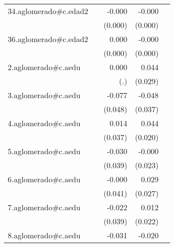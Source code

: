 {\begin{longtable}{l*{4}{D{.}{.}{-1}}}
\addlinespace
34.aglomerado#c.edad2&                     &      -0.000         &      -0.000\sym{**} &                     \\
            &                     &     (0.000)         &     (0.000)         &                     \\
\addlinespace
36.aglomerado#c.edad2&                     &       0.000         &      -0.000         &                     \\
            &                     &     (0.000)         &     (0.000)         &                     \\
\addlinespace
2.aglomerado#c.aedu&                     &       0.000         &       0.044         &                     \\
            &                     &         (.)         &     (0.029)         &                     \\
\addlinespace
3.aglomerado#c.aedu&                     &      -0.077         &      -0.048         &                     \\
            &                     &     (0.048)         &     (0.037)         &                     \\
\addlinespace
4.aglomerado#c.aedu&                     &       0.014         &       0.044\sym{*}  &                     \\
            &                     &     (0.037)         &     (0.020)         &                     \\
\addlinespace
5.aglomerado#c.aedu&                     &      -0.030         &      -0.000         &                     \\
            &                     &     (0.039)         &     (0.023)         &                     \\
\addlinespace
6.aglomerado#c.aedu&                     &      -0.000         &       0.029         &                     \\
            &                     &     (0.041)         &     (0.027)         &                     \\
\addlinespace
7.aglomerado#c.aedu&                     &      -0.022         &       0.012         &                     \\
            &                     &     (0.039)         &     (0.022)         &                     \\
\addlinespace
8.aglomerado#c.aedu&                     &      -0.031         &      -0.020         &                     \\

\end{longtable}}
